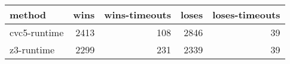 \begin{tabular}{lrrrr}
\hline
 method       &   wins &   wins-timeouts &   loses &   loses-timeouts \\
\hline
 cvc5-runtime &   2413 &             108 &    2846 &               39 \\
 z3-runtime   &   2299 &             231 &    2339 &               39 \\
\hline
\end{tabular}
